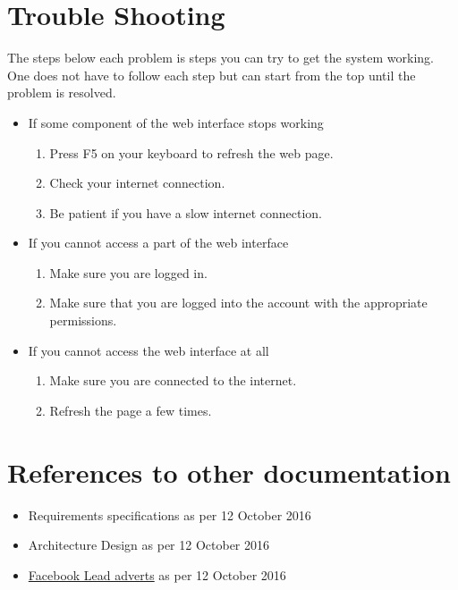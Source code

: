 \documentclass{article}
\begin{document}
	\section{Trouble Shooting}
		The steps below each problem is steps you can try to get the system working.
		One does not have to follow each step but can start from the top until the problem is resolved.
		\begin{itemize}
			\item If some component of the web interface stops working
				\begin{enumerate}
					\item Press F5 on your keyboard to refresh the web page.
					\item Check your internet connection.
					\item Be patient if you have a slow internet connection.
				\end{enumerate}
			\item If you cannot access a part of the web interface
				\begin{enumerate}
					\item Make sure you are logged in.
					\item Make sure that you are logged into the account with the appropriate permissions.
				\end{enumerate}
			\item If you cannot access the web interface at all
				\begin{enumerate}
					\item Make sure you are connected to the internet.
					\item Refresh the page a few times.
				\end{enumerate}
		\end{itemize}

	\section{References to other documentation}
		\begin{itemize}
			\item{Requirements specifications as per 12 October 2016}
			\item{Architecture Design as per 12 October 2016}
			\item{\href{https://www.facebook.com/business/a/lead-ads}{Facebook Lead adverts} as per 12 October 2016}
		\end{itemize}
\end{document}
